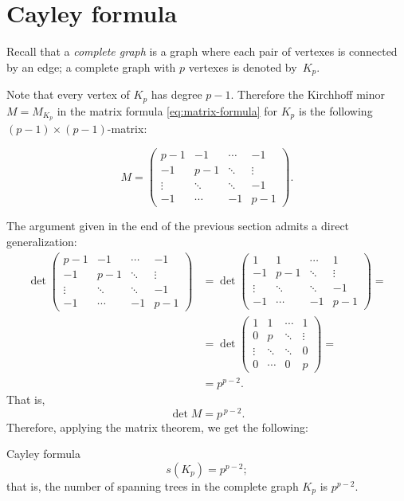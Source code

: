 \section*{Cayley formula}

Recall that a \emph{complete graph} is a graph where each pair of vertexes is connected by an edge;
a complete graph with $p$ vertexes is denoted by~$K_p$.

Note that every vertex of $K_p$ has degree $p-1$.
Therefore the Kirchhoff minor $M=M_{K_p}$ in the matrix formula \ref{eq:matrix-formula} for $K_p$ is the following $(p-1)\times (p-1)$-matrix:

\[
M=\left(
\begin{matrix}
p{-}1&-1&\cdots&-1
\\
-1&p{-}1&\ddots&\vdots
\\
\vdots&\ddots&\ddots&-1
\\
-1&\cdots&-1&p{-}1
\end{matrix}
\right).
\]

The argument given in the end of the previous section admits a direct generalization:
\begin{align*}
\det\left(
\begin{matrix}
p{-}1&-1&\cdots&-1
\\
-1&p{-}1&\ddots&\vdots
\\
\vdots&\ddots&\ddots&-1
\\
-1&\cdots&-1&p{-}1
\end{matrix}
\right)
&=\det\left(
\begin{matrix}
1&1&\cdots&1
\\
-1&p{-}1&\ddots&\vdots
\\
\vdots&\ddots&\ddots&-1
\\
-1&\cdots&-1&p{-}1
\end{matrix}
\right)
=
\\
&=
\det\left(
\begin{matrix}
1&1&\cdots&1
\\
0&p&\ddots&\vdots
\\
\vdots&\ddots&\ddots&0
\\
0&\cdots&0&p
\end{matrix}
\right)=
\\
&=  p^{p-2}.
\end{align*}
That is,
\[\det M=p^{\,p-2}.\]
Therefore, applying the matrix theorem, we get the following:

\begin{thm}{Cayley formula}\label{thm:cayley}
 \[s(K_p)=p^{p-2};\]
that is, the number of spanning trees in the complete graph $K_p$ is $p^{p-2}$.
\end{thm}

